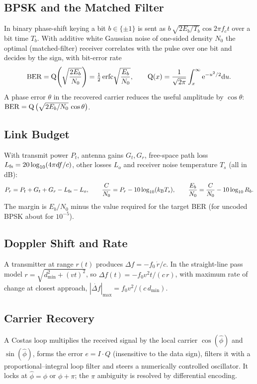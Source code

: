 \documentclass[11pt,a4paper]{article}
\begin{document}
\subsection{BPSK and the Matched Filter}
In binary phase-shift keying a bit $b\in\{\pm1\}$ is sent as $b\,\sqrt{2E_b/T_b}\cos2\pi f_ct$ over a bit time $T_b$. With additive white Gaussian noise of one-sided density $N_0$ the optimal (matched-filter) receiver correlates with the pulse over one bit and decides by the sign, with bit-error rate
\begin{equation}
  \mathrm{BER}=\operatorname{Q}\!\left(\sqrt{\frac{2E_b}{N_0}}\right)=\tfrac12\operatorname{erfc}\!\sqrt{\frac{E_b}{N_0}},\qquad \operatorname{Q}(x)=\frac1{\sqrt{2\pi}}\int_x^\infty\mathrm{e}^{-u^2/2}\mathrm{d} u.
  \label{eq:ber}
\end{equation}
A phase error $\theta$ in the recovered carrier reduces the useful amplitude by $\cos\theta$: $\mathrm{BER}=\operatorname{Q}\big(\sqrt{2E_b/N_0}\,\cos\theta\big)$.

\subsection{Link Budget}
With transmit power $P_t$, antenna gains $G_t,G_r$, free-space path loss $L_{\rm fs}=20\log_{10}(4\pi df/c)$, other losses $L_o$ and receiver noise temperature $T_s$ (all in dB):
\begin{equation}
  P_r=P_t+G_t+G_r-L_{\rm fs}-L_o,\qquad \frac{C}{N_0}=P_r-10\log_{10}(k_{\mathrm B} T_s),\qquad \frac{E_b}{N_0}=\frac{C}{N_0}-10\log_{10}R_b .
  \label{eq:link}
\end{equation}
The margin is $E_b/N_0$ minus the value required for the target BER (for uncoded BPSK about  for $10^{-5}$).

\subsection{Doppler Shift and Rate}
A transmitter at range $r(t)$ produces $\Delta f=-f_0\,\dot r/c$. In the straight-line pass model $r=\sqrt{d_{\min}^2+(vt)^2}$, so $\Delta f(t)=-f_0v^2t/(c\,r)$, with maximum rate of change at closest approach, $|\dot{\Delta f}|_{\max}=f_0v^2/(c\,d_{\min})$.

\subsection{Carrier Recovery}
A Costas loop multiplies the received signal by the local carrier $\cos(\hat\phi)$ and $\sin(\hat\phi)$, forms the error $e=I\cdot Q$ (insensitive to the data sign), filters it with a proportional--integral loop filter and steers a numerically controlled oscillator. It locks at $\hat\phi=\phi$ or $\phi+\pi$; the $\pi$ ambiguity is resolved by differential encoding.
\end{document}
